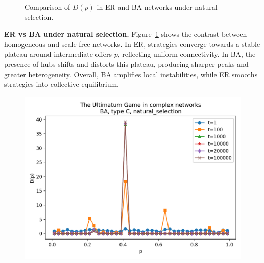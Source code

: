 \begin{figure}[h!]
\begin{minipage}[t]{0.48\textwidth}
        \label{fig:BA_Dp}
    \end{minipage}
    \caption{Comparison of $D(p)$ in ER and BA networks under natural selection.}
    \label{fig:ER_BA_Dp}
\end{figure}

\noindent\textbf{ER vs BA under natural selection.}  
Figure~\ref{fig:ER_BA_Dp} shows the contrast between homogeneous and scale-free
networks. In ER, strategies converge towards a stable plateau around
intermediate offers $p$, reflecting uniform connectivity.  
In BA, the presence of hubs shifts and distorts this plateau, producing sharper
peaks and greater heterogeneity. Overall, BA amplifies local instabilities,
while ER smooths strategies into collective equilibrium.

\begin{figure}[h!]
    \centering
    \setlength{\tabcolsep}{2pt}
    \begin{minipage}[t]{0.48\textwidth}
        \centering
        \includegraphics[width=\textwidth]{images/TASK1/Dp_BA_C_natural_selection.png}
        \label{fig:BA_Dp_C}
    \end{minipage}
    \hfill
    \begin{minipage}[t]{0.48\textwidth}
        \centering

\end{minipage}
\end{figure}
